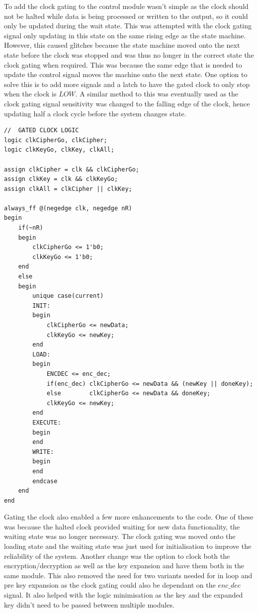 \documentclass[12pt,twoside,a4paper]{report}
\begin{document}
	To add the clock gating to the control module wasn't simple as the clock should not be halted while data is being processed or written to the output, so it could only be updated during the wait state. This was attempted with the clock gating signal only updating in this state on the same rising edge as the state machine. However, this caused glitches because the state machine moved onto the next state before the clock was stopped and was thus no longer in the correct state the clock gating when required. This was because the same edge that is needed to update the control signal moves the machine onto the next state. One option to solve this is to add more signals and a latch to have the gated clock to only stop when the clock is $LOW$. A similar method to this was eventually used as the clock gating signal sensitivity was changed to the falling edge of the clock, hence updating half a clock cycle before the system changes state.

	\begin{minipage}{\linewidth}
	\begin{lstlisting}[label={lst:Clock_Gating},caption={The next state logic for the ($PRE$) control module},style=SVStyle]
//	GATED CLOCK LOGIC
logic clkCipherGo, clkCipher;
logic clkKeyGo, clkKey, clkAll;

assign clkCipher = clk && clkCipherGo;
assign clkKey = clk && clkKeyGo;
assign clkAll = clkCipher || clkKey;

always_ff @(negedge clk, negedge nR)
begin
	if(~nR)
	begin
		clkCipherGo <= 1'b0;
		clkKeyGo <= 1'b0;
	end
	else
	begin
		unique case(current)
		INIT:
		begin
			clkCipherGo <= newData;
			clkKeyGo <= newKey;
		end
		LOAD:
		begin
			ENCDEC <= enc_dec;
			if(enc_dec)	clkCipherGo <= newData && (newKey || doneKey);
			else		clkCipherGo <= newData && doneKey;
			clkKeyGo <= newKey;
		end
		EXECUTE:
		begin
		end
		WRITE:
		begin
		end
		endcase
	end
end
	\end{lstlisting}
	\end{minipage}
	
	Gating the clock also enabled a few more enhancements to the code. One of these was because the halted clock provided waiting for new data functionality, the waiting state was no longer necessary. The clock gating was moved onto the loading state and the waiting state was just used for initialisation to improve the reliability of the system. Another change was the option to clock both the encryption/decryption as well as the key expansion and have them both in the same module. This also removed the need for two variants needed for in loop and pre key expansion as the clock gating could also be dependant on the $enc\_dec$ signal. It also helped with the logic minimisation as the key and the expanded key didn't need to be passed between multiple modules.
	
\end{document}
